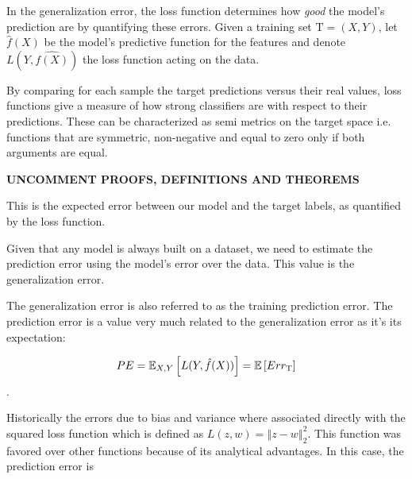 In the generalization error, the loss function  determines how \textit{good} the model's prediction are by quantifying these errors. Given a training set $\mathrm{T} = (X,Y)$, let $\hat{f}(X)$ be the model's predictive function for the features and denote $L( Y,\hat{f(X)} )$ the loss function acting on the data.

By comparing for each sample the target predictions versus their real values, loss functions give a measure of how strong classifiers are with respect to their predictions. These can be characterized as semi metrics on the target space i.e. functions that are symmetric, non-negative and equal to zero only if both arguments are equal.

{\huge \textbf{UNCOMMENT PROOFS, DEFINITIONS AND THEOREMS}}


This is the expected error between our model and the target labels, as quantified by the loss function.

Given that any model is always built on a dataset, we need to estimate the prediction error using the model's error over the data.  This value is the generalization error.


The generalization error is also referred to as the training prediction error. The prediction error is a value very much related to the generalization error as it's its expectation:

\begin{equation}
 PE = \operatorname{\mathbb{E}}_{X,Y} \left[ L(Y,\hat{f}(X))\right] =  \operatorname{\mathbb{E}} \left[ Err_{\mathrm{T}}  \right]
 \end{equation}.

Historically the errors due to bias and variance where associated directly with the squared loss function which is defined as $L(z,w) = \left\Vert z-w \right\Vert^2_2$. This function was favored over other functions because of its analytical advantages.  In this case, the prediction error is

